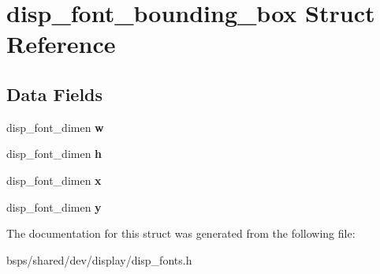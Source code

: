 \hypertarget{structdisp__font__bounding__box}{}\section{disp\+\_\+font\+\_\+bounding\+\_\+box Struct Reference}
\label{structdisp__font__bounding__box}
\subsection*{Data Fields}
\begin{DoxyCompactItemize}
\item 
\mbox{\label{structdisp__font__bounding__box_a83b694eae86b0dfbc36a024f522a6625}} 
disp\+\_\+font\+\_\+dimen {\bfseries w}
\item 
\mbox{\label{structdisp__font__bounding__box_a6972e3384bf77b67b8fc5cb5b220c855}} 
disp\+\_\+font\+\_\+dimen {\bfseries h}
\item 
\mbox{\label{structdisp__font__bounding__box_ae241907f3113865f70131733a29ff6f4}} 
disp\+\_\+font\+\_\+dimen {\bfseries x}
\item 
\mbox{\label{structdisp__font__bounding__box_a3d2811e379eea57df1fce324e41e490c}} 
disp\+\_\+font\+\_\+dimen {\bfseries y}
\end{DoxyCompactItemize}


The documentation for this struct was generated from the following file\+:\begin{DoxyCompactItemize}
\item 
bsps/shared/dev/display/disp\+\_\+fonts.\+h\end{DoxyCompactItemize}
